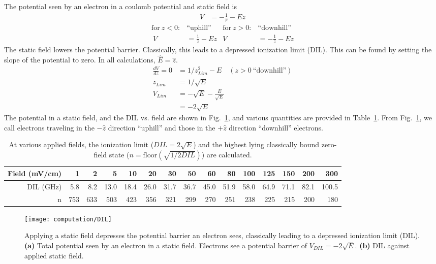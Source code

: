 \documentclass[aps,pra,preprint,groupedaddress]{revtex4-1}
\begin{document}
The potential seen by an electron in a coulomb potential and static field is 
\begin{align*}
V & = -\frac{1}{r} - Ez
\end{align*}
\begin{align*}
\text{for} ~ z < 0: & \text{``uphill''} & \text{for} ~ z > 0: & \text{``downhill''} \\\
V & = \frac{1}{z} - Ez & V & = -\frac{1}{z} - Ez
\end{align*}
The static field lowers the potential barrier. Classically, this leads to a depressed ionization limit (DIL). This can be found by setting the slope of the potential to zero. In all calculations, $\hat{E} = \hat{z}$.
\begin{align*}
\frac{dV}{dz} = 0 & = 1/z_{Lim}^2 - E \quad (z>0 ~ \text{``downhill''}) \\
z_{Lim} & = 1/\sqrt{E} \\
V_{Lim} & = -\sqrt{E} - \frac{E}{\sqrt{E}} \\
 & = -2 \sqrt{E}
\end{align*}
The potential in a static field, and the DIL vs. field are shown in Fig.~\ref{fig:DIL}, and various quantities are provided in Table~\ref{tab:DIL}. From Fig.~\ref{fig:DIL}, we call electrons traveling in the $-\hat{z}$ direction ``uphill'' and those in the $+\hat{z}$ direction ``downhill'' electrons.

\begin{table}
\caption{\label{tab:DIL} At various applied fields, the ionization limit ($DIL = 2\sqrt{E}$) and the highest lying classically bound zero-field state ($n = \text{floor}(\sqrt{1/2DIL})$) are calculated.}
\begin{ruledtabular}
\begin{tabular}{r||r|r|r|r|r|r|r|r|r|r|r|r|r|r}
Field (mV/cm) & 1 & 2 & 5 & 10 & 20 & 30 & 50 & 60 & 80 & 100 & 125 & 150 & 200 & 300 \\ \hline
DIL (GHz) & 5.8 & 8.2 & 13.0 & 18.4 & 26.0 & 31.7 & 36.7 & 45.0 & 51.9 & 58.0 & 64.9 & 71.1 & 82.1 & 100.5 \\ \hline
n & 753 & 633 & 503 & 423 & 356 & 321 & 299 & 270 & 251 & 238 & 225 & 215 & 200 & 180
\end{tabular}
\end{ruledtabular}
\end{table}

\begin{figure}
\texttt{[image: computation/DIL]}
\caption{\label{fig:DIL} Applying a static field depresses the potential barrier an electron sees, classically leading to a depressed ionization limit (DIL). \textbf{(a)} Total potential seen by an electron in a static field. Electrons see a potential barrier of $V_{DIL} = -2\sqrt{E}$. \textbf{(b)} DIL against applied static field.}
\end{figure}
\end{document}
